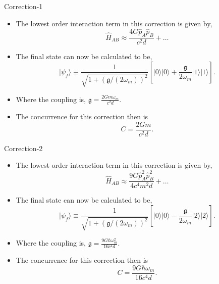 \documentclass[12pt,aspectratio=1610]{beamer}
\newcommand{\Hab}{\hat{H}_{AB}}
\newcommand{\g}{\mathfrak{g}}
\begin{document}
\begin{frame}{Correction-1}
    \begin{itemize}
        \item The lowest order interaction term in this correction is given by,
        \begin{equation*}
    \Hab  \approx \frac{4G\hat{p}_{A}\hat{p}_{B}}{c^{2}d} + \ldots
\end{equation*}
\item The final state can now be calculated to be,
\begin{equation*}
    \vert\psi_{f}\rangle\equiv\frac{1}{\sqrt{1+(\mathfrak{g}/(2\omega_{m}))^{2}}}[\vert0\rangle\vert0\rangle+\frac{\mathfrak{g}}{2\omega_{m}}\vert1\rangle\vert1\rangle].
\end{equation*}
\item Where the coupling is, $\g = \frac{2Gm\omega_m}{c^2d}$.
\item The concurrence for this correction then is  $$C = \frac{2Gm}{c^2d}.$$
    \end{itemize}
\end{frame}

\begin{frame}{Correction-2}
    \begin{itemize}
        \item The lowest order interaction term in this correction is given by,
        \begin{equation*}
    \Hab \approx \frac{9G{\hat{p}}_{A}^{2}{\hat{p}}_{B}^{2}}{4c^{4}m^{2}d} + \ldots
\end{equation*}
\item The final state can now be calculated to be,
\begin{equation*}
     \vert\psi_{f}\rangle\equiv\frac{1}{\sqrt{1+(\mathfrak{g}/(2\omega_{m}))^{2}}}[\vert0\rangle\vert0\rangle-\frac{\mathfrak{g}}{2\omega_{m}}\vert2\rangle\vert2\rangle].
\end{equation*}
\item Where the coupling is, $\g = \frac{9G\hbar\omega_m^2}{16c^4d}$.
\item The concurrence for this correction then is  $$C = \frac{9G\hbar\omega_m}{16c^4d}.$$
    \end{itemize}
\end{frame}
\end{document}

